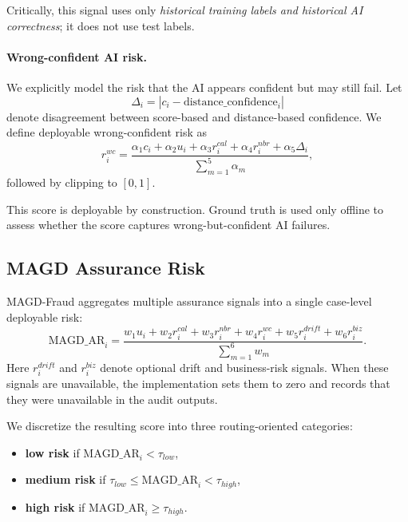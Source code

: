 Critically, this signal uses only \emph{historical training labels and historical AI correctness}; it does not use test labels.

\paragraph{Wrong-confident AI risk.}
We explicitly model the risk that the AI appears confident but may still fail. Let
\begin{equation}
\Delta_i = \left|c_i - \text{distance\_confidence}_i\right|
\end{equation}
denote disagreement between score-based and distance-based confidence. We define deployable wrong-confident risk as
\begin{equation}
r^{wc}_i =
\frac{
\alpha_1 c_i +
\alpha_2 u_i +
\alpha_3 r^{cal}_i +
\alpha_4 r^{nbr}_i +
\alpha_5 \Delta_i
}{
\sum_{m=1}^{5}\alpha_m
},
\end{equation}
followed by clipping to $[0,1]$.

This score is deployable by construction. Ground truth is used only offline to assess whether the score captures wrong-but-confident AI failures.

\subsection{MAGD Assurance Risk}
\label{subsec:magd_risk}

MAGD-Fraud aggregates multiple assurance signals into a single case-level deployable risk:
\begin{equation}
\text{MAGD\_AR}_i =
\frac{
w_1 u_i +
w_2 r^{cal}_i +
w_3 r^{nbr}_i +
w_4 r^{wc}_i +
w_5 r^{drift}_i +
w_6 r^{biz}_i
}{
\sum_{m=1}^{6} w_m
}.
\end{equation}
Here $r^{drift}_i$ and $r^{biz}_i$ denote optional drift and business-risk signals. When these signals are unavailable, the implementation sets them to zero and records that they were unavailable in the audit outputs.

We discretize the resulting score into three routing-oriented categories:
\begin{itemize}
\item \textbf{low risk} if $\text{MAGD\_AR}_i < \tau_{low}$,
\item \textbf{medium risk} if $\tau_{low} \le \text{MAGD\_AR}_i < \tau_{high}$,
\item \textbf{high risk} if $\text{MAGD\_AR}_i \ge \tau_{high}$.
\end{itemize}

